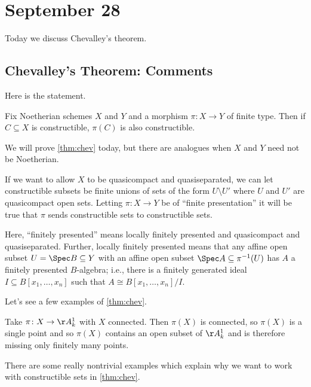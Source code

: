 \documentclass[../notes.tex]{subfiles}
\begin{document}
\section{September 28}

Today we discuss Chevalley's theorem.

\subsection{Chevalley's Theorem: Comments}
Here is the statement.
\begin{theorem} \label{thm:chev}
	Fix Noetherian schemes $X$ and $Y$ and a morphism $\pi\colon X\to Y$ of finite type. Then if $C\subseteq X$ is constructible, $\pi(C)$ is also constructible.
\end{theorem}
We will prove \autoref{thm:chev} today, but there are analogues when $X$ and $Y$ need not be Noetherian.
\begin{remark}
	If we want to allow $X$ to be quasicompact and quasiseparated, we can let constructible subsets be finite unions of sets of the form $U\setminus U'$ where $U$ and $U'$ are quasicompact open sets. Letting $\pi\colon X\to Y$ be of ``finite presentation'' it will be true that $\pi$ sends constructible sets to constructible sets.
	
	Here, ``finitely presented'' means locally finitely presented and quasicompact and quasiseparated. Further, locally finitely presented means that any affine open subset $U=\Spec B\subseteq Y$ with an affine open subset $\Spec A\subseteq\pi^{-1}(U)$ has $A$ a finitely presented $B$-algebra; i.e., there is a finitely generated ideal $I\subseteq B[x_1,\ldots,x_n]$ such that $A\cong B[x_1,\ldots,x_n]/I$.
\end{remark}
Let's see a few examples of \autoref{thm:chev}.
\begin{example}
	Take $\pi\colon X\to\AA^1_k$ with $X$ connected. Then $\pi(X)$ is connected, so $\pi(X)$ is a single point and so $\pi(X)$ contains an open subset of $\AA^1_k$ and is therefore missing only finitely many points.
\end{example}
There are some really nontrivial examples which explain why we want to work with constructible sets in \autoref{thm:chev}.
\end{document}
